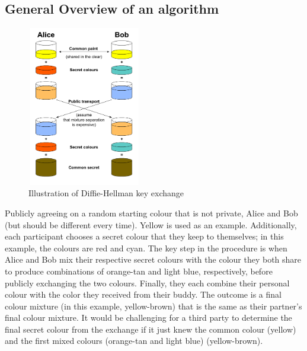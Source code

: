 \documentclass{article}
\begin{document}
\subsection{General Overview of an algorithm}

\begin{figure}
\caption{Illustration of Diffie-Hellman key exchange}
\includegraphics[width=5cm,height=7cm]{Color.png}
\end{figure} 
Publicly agreeing on a random starting colour that is not private, Alice and Bob (but should be different every time). Yellow is used as an example. Additionally, each participant chooses a secret colour that they keep to themselves; in this example, the colours are red and cyan. The key step in the procedure is when Alice and Bob mix their respective secret colours with the colour they both share to produce combinations of orange-tan and light blue, respectively, before publicly exchanging the two colours. Finally, they each combine their personal colour with the color they received from their buddy. The outcome is a final colour mixture (in this example, yellow-brown) that is the same as their partner's final colour mixture.
It would be challenging for a third party to determine the final secret colour from the exchange if it just knew the common colour (yellow) and the first mixed colours (orange-tan and light blue) (yellow-brown).
\end{document}
